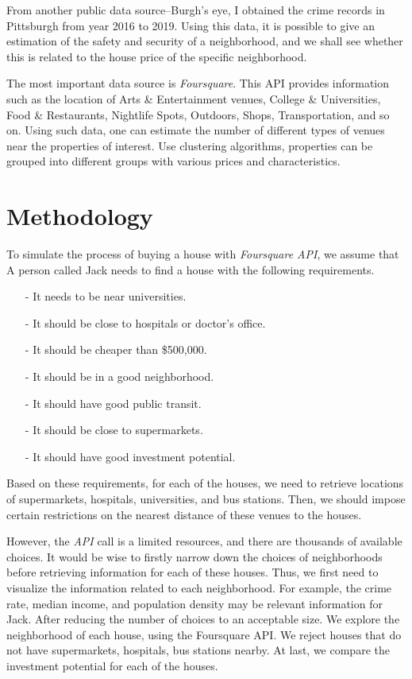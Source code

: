 \documentclass[11pt,notitlepage]{article}
\begin{document}
From another public data source--Burgh's eye, I obtained the crime records
in Pittsburgh from year 2016 to 2019. Using this data, it is possible to give
an estimation of the safety and security of a neighborhood, and we shall see
whether this is related to the house price of the specific neighborhood.

The most important data source is \textit{Foursquare}.
This API provides information such as the location of
Arts \& Entertainment venues, College \& Universities, Food \& Restaurants,
Nightlife Spots, Outdoors, Shops, Transportation, and so on.
Using such data, one can estimate the number of different types of venues
near the properties of interest.
Use clustering algorithms, properties can be grouped into different groups
with various prices and characteristics.

\section{Methodology}
To simulate the process of buying a house with \textit{Foursquare API},
we assume that A person called Jack needs to find a house with the following requirements.
\begin{enumerate}
\item[-] It needs to be near universities.
\item[-] It should be close to hospitals or doctor's office.
\item[-] It should be cheaper than \$500,000.
\item[-] It should be in a good neighborhood.
\item[-] It should have good public transit.
\item[-] It should be close to supermarkets.
\item[-] It should have good investment potential.
\end{enumerate}

Based on these requirements, for each of the houses, we need to
retrieve locations of supermarkets, hospitals, universities, and
bus stations. Then, we should impose certain restrictions
on the nearest distance of these venues to the houses.

However, the \textit{API} call is a limited resources, and
there are thousands of available choices.
It would be wise to firstly narrow down the choices of neighborhoods
before retrieving information for each of these houses.
Thus, we first need to visualize the information related to each
neighborhood. For example, the crime rate, median income, and population density
may be relevant information for Jack.
After reducing the number of choices to an acceptable size.
We explore the neighborhood of each house, using the Foursquare API.
We reject houses that do not have supermarkets, hospitals,
bus stations nearby.
At last, we compare the investment potential for each of the houses.
\end{document}
